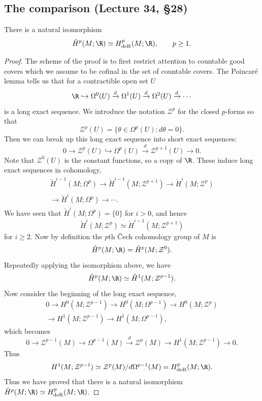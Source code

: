 \subsection*{The comparison (Lecture 34, \S28)}
\begin{theorem}
There is a natural isomorphism
\[
\check H^p(M;\R)\simeq H^p_{\mathrm{deR}}(M;\R),\qquad p\ge1.
\]
\end{theorem}
\begin{proof}
The scheme of the proof is to first restrict attention to countable good covers which we assume to be cofinal in the set of countable covers. The Poincar\'e lemma tells us that for a contractible open set $U$
\[
\R\hookrightarrow\Omega^0(U)\xrightarrow d\Omega^1(U)
\xrightarrow d\Omega^2(U)\xrightarrow d\cdots
\]
is a long exact sequence. We introduce the notation $\mathcal Z^p$ for the closed $p$-forms so that
\[
\mathcal Z^p(U)=\{\theta\in\Omega^p(U):d\theta=0\}.
\]
Then we can break up this long exact sequence into short exact sequences:
\[
0\longrightarrow\mathcal Z^p(U)\hookrightarrow\Omega^p(U)
\xrightarrow d\mathcal Z^{p+1}(U)\longrightarrow0.
\]
Note that $\mathcal Z^0(U)$ is the constant functions, so a copy of $\R$. These induce long exact sequences in cohomology,
\begin{multline*}
\check H^{i-1}(M;\Omega^p)\longrightarrow\check H^{i-1}(M;\mathcal Z^{p+1})
\longrightarrow\check H^i(M;\mathcal Z^p)\\
\longrightarrow\check H^i(M;\Omega^p)\longrightarrow\cdots.
\end{multline*}
We have seen that $\check H^i(M;\Omega^p)=\{0\}$ for $i>0$, and hence
\[
\check H^i(M;\mathcal Z^p)\simeq\check H^{i-1}(M;\mathcal Z^{p+1})
\]
for $i\ge2$. Now by definition the $p$th \v Cech cohomology group of $M$ is
\[
\check H^p(M;\R)=\check H^p(M;\mathcal Z^0).
\]
Repeatedly applying the isomorphism above, we have
\[
\check H^p(M;\R)\simeq\check H^1(M;\mathcal Z^{p-1}).
\]
Now consider the beginning of the long exact sequence,
\begin{multline*}
0\longrightarrow H^0(M;\mathcal Z^{p-1})\longrightarrow H^0(M;\Omega^{p-1})
\longrightarrow H^0(M;\mathcal Z^p)\\
\longrightarrow H^1(M;\mathcal Z^{p-1})\longrightarrow H^1(M;\Omega^{p-1}),
\end{multline*}
which becomes
\[
0\longrightarrow\mathcal Z^{p-1}(M)\longrightarrow\Omega^{p-1}(M)
\xrightarrow d\mathcal Z^p(M)\longrightarrow H^1(M;\mathcal Z^{p-1})\longrightarrow0.
\]
Thus
\[
H^1(M;\mathcal Z^{p-1})\simeq\mathcal Z^p(M)/d\Omega^{p-1}(M)
=H^p_{\mathrm{deR}}(M;\R).
\]
Thus we have proved that there is a natural isomorphism
$\check H^p(M;\R)\simeq H^p_{\mathrm{deR}}(M;\R)$.
\end{proof}
